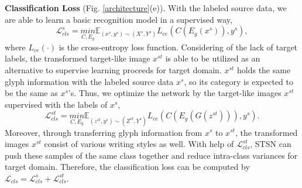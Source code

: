 \documentclass[10pt,journal,compsoc,twocolumn ]{IEEEtran}
\begin{document}
\textbf{Classification Loss} (Fig. \ref{architecture}(e)). With the labeled source data, we are able to learn a basic recognition model in a supervised way,
\begin{equation}
\mathcal{L}_{cls}^{s}=\underset{C,E_g }{min}\mathbb{E}_{\left ( x^s,y^s \right )\sim \left ( X^s,Y^s \right )}L_{ce}\left ( C\left ( E_g(x^s) \right ),y^s \right ), \label{src_cls}
\end{equation}
where $L_{ce}(\cdot)$ is the cross-entropy loss function. %
Considering of the lack of target labels, the transformed target-like image $x^{st}$ is able to be utilized as an alternative to supervise learning proceeds for target domain. $x^{st}$ holds the same glyph information with the labeled source data $x^s$, so its category is expected to be the same as $x^s$'s. %
Thus, we optimize the network by the target-like images $x^{st}$ supervised with the labels of $x^s$,
\begin{equation}
\mathcal{L}_{cls}^{st}=\underset{C,E_g }{min}\mathbb{E}_{\left ( z^{st},y^s \right )\sim \left ( Z^{st},Y^s \right )}L_{ce}\left ( C\left ( E_g\left ( G\left ( z^{st} \right ) \right ) \right ),y^s \right ). \label{st_cls}
\end{equation}
Moreover, through transferring glyph information from $x^s$ to $x^{st}$, the transformed images $x^{st}$ consist of various writing styles as well. With help of $\mathcal{L}_{cls}^{st}$, STSN can push these samples of the same class together  and reduce intra-class variances for target domain. %
Therefore, the classification loss can be computed by $\mathcal{L}_{cls} = \mathcal{L}_{cls}^s + \mathcal{L}_{cls}^{st}$.
\end{document}
